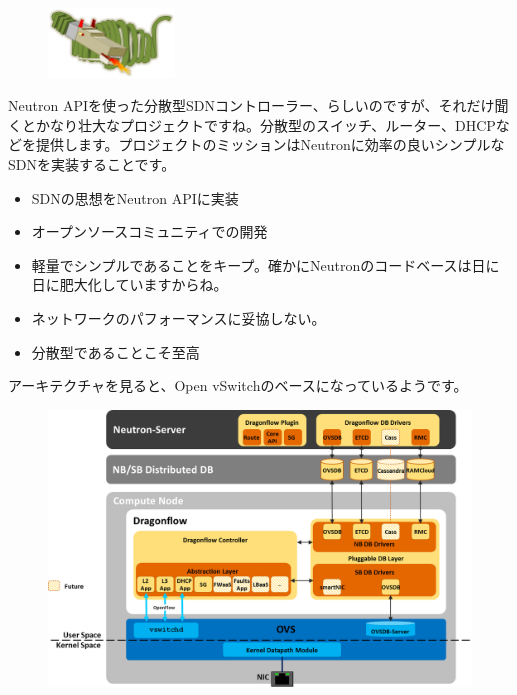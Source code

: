 \begin{figure}
	\begin{center}
		\includegraphics[width=0.3\textwidth]{img/Df_logo.png}
	\end{center}
\end{figure}

Neutron APIを使った分散型SDNコントローラー、らしいのですが、それだけ聞くとかなり壮大なプロジェクトですね。分散型のスイッチ、ルーター、DHCPなどを提供します。プロジェクトのミッションはNeutronに効率の良いシンプルなSDNを実装することです。

\begin{itemize}
	\item SDNの思想をNeutron APIに実装
	\item オープンソースコミュニティでの開発
	\item 軽量でシンプルであることをキープ。確かにNeutronのコードベースは日に日に肥大化していますからね。
	\item ネットワークのパフォーマンスに妥協しない。
	\item 分散型であることこそ至高
\end{itemize}

アーキテクチャを見ると、Open vSwitchのベースになっているようです。

\begin{figure}
	\includegraphics[width=\textwidth]{img/dragonflow_distributed_architecture.png}
\end{figure}

